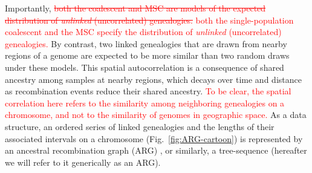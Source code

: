 \documentclass[11pt]{article}
\begin{document}
Importantly, 
\textcolor{red}{
\sout{both the coalescent and MSC are models of the expected distribution of 
\emph{unlinked} (uncorrelated) genealogies.
}
both the single-population coalescent and the MSC specify 
the distribution of \emph{unlinked} (uncorrelated) genealogies.
}
By contrast, two linked genealogies that are drawn from nearby regions of a genome %
are expected to be more similar than two random draws under these models. This spatial 
autocorrelation is a consequence of shared ancestry among samples at nearby regions, 
which decays over time and distance as recombination events reduce their shared ancestry.
\textcolor{red}{
To be clear, the spatial correlation here refers to the similarity 
among neighboring genealogies on a chromosome, and not to the similarity of genomes 
in geographic space.
}
As a data structure, an ordered series of linked genealogies and the lengths of 
their associated intervals on a chromosome (Fig.~\ref{fig:ARG-cartoon}) is represented 
by an ancestral recombination graph (ARG)
\citep{griffiths_ancestral_1996}, or similarly, a tree-sequence 
\citep{kelleher2016efficient}
(hereafter we will refer to it generically as an ARG).
\end{document}
